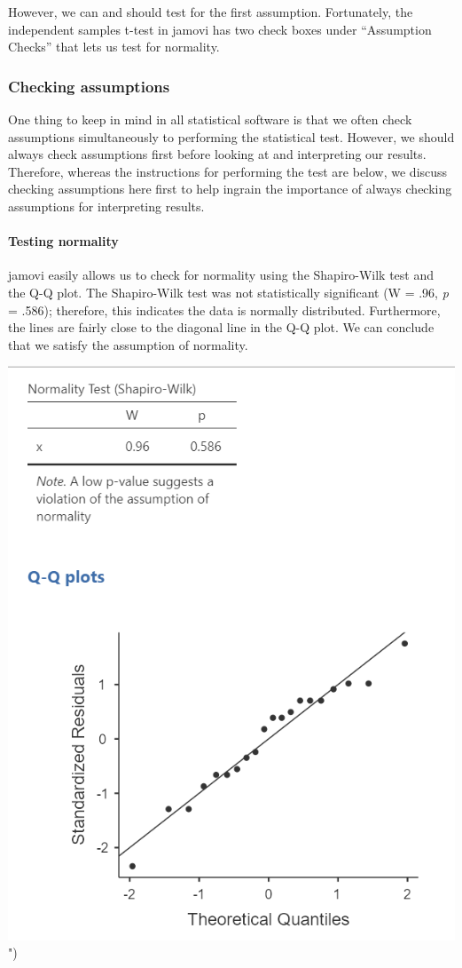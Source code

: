 \documentclass[
]{book}
\begin{document}
However, we can and should test for the first assumption. Fortunately, the independent samples t-test in jamovi has two check boxes under ``Assumption Checks'' that lets us test for normality.

\hypertarget{checking-assumptions-1}{%
\subsubsection{Checking assumptions}\label{checking-assumptions-1}}

One thing to keep in mind in all statistical software is that we often check assumptions simultaneously to performing the statistical test. However, we should always check assumptions first before looking at and interpreting our results. Therefore, whereas the instructions for performing the test are below, we discuss checking assumptions here first to help ingrain the importance of always checking assumptions for interpreting results.

\hypertarget{testing-normality}{%
\paragraph{Testing normality}\label{testing-normality}}

jamovi easily allows us to check for normality using the Shapiro-Wilk test and the Q-Q plot. The Shapiro-Wilk test was not statistically significant (W = .96, \emph{p} = .586); therefore, this indicates the data is normally distributed. Furthermore, the lines are fairly close to the diagonal line in the Q-Q plot. We can conclude that we satisfy the assumption of normality.

\includegraphics{images/07.1-one_sample_t-test/normality.png}")
\end{document}
